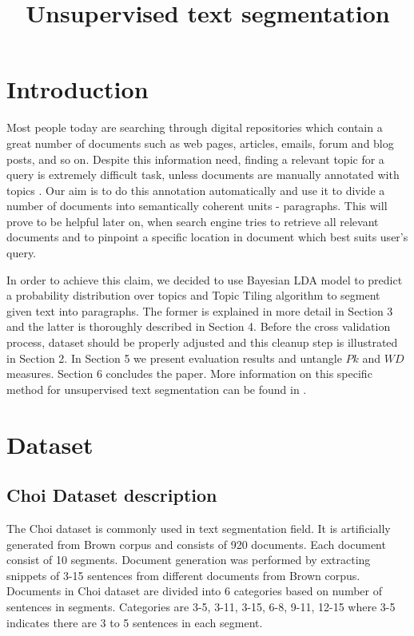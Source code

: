 \documentclass[10pt, a4paper]{article}
\title{Unsupervised text segmentation}
\begin{document}
\maketitleabstract

\section{Introduction}
Most people today are searching through digital repositories which contain a great number of documents such as web pages, articles, emails, forum and blog posts, and so on. Despite this information need, finding a relevant topic for a query is extremely difficult task, unless documents are manually annotated with topics \citep{ml-book}. Our aim is to do this annotation automatically and use it to divide a number of documents into semantically coherent units - paragraphs. This will prove to be helpful later on, when search engine tries to retrieve all relevant documents and to pinpoint a specific location in document which best suits user's query.

In order to achieve this claim, we decided to use Bayesian LDA model to predict a probability distribution over topics and Topic Tiling algorithm to segment given text into paragraphs. The former is explained in more detail in Section 3 and the latter is thoroughly described in Section 4. Before the cross validation process, dataset should be properly adjusted and this cleanup step is illustrated in Section 2. In Section 5 we present evaluation results and untangle $Pk$ and $WD$ measures. Section 6 concludes the paper.
More information on this specific method for unsupervised text segmentation can be found in \citep{ref2,ref4,ref-asistent,ref3}. 

\section{Dataset}

\subsection{Choi Dataset description}
The Choi dataset \citep{choi-ref} is commonly used in text segmentation field. It is artificially generated from Brown corpus and consists of 920 documents. Each document consist of 10 segments. Document generation was performed by extracting snippets of 3-15 sentences from different documents from Brown corpus. Documents in Choi dataset are divided into 6 categories based on number of sentences in segments. Categories are 3-5, 3-11, 3-15, 6-8, 9-11, 12-15 where 3-5 indicates there are 3 to 5 sentences in each segment. 
\end{document}
